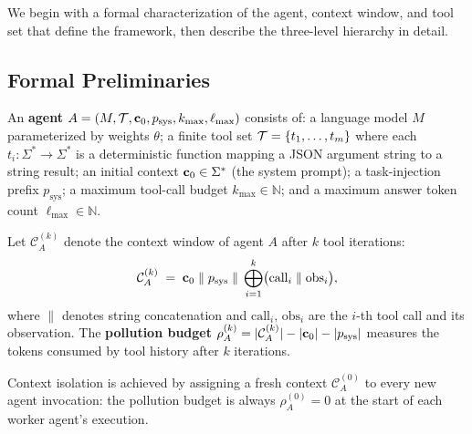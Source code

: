 
We begin with a formal characterization of the agent, context window, and
tool set that define the framework, then describe the three-level hierarchy
in detail.

\subsection{Formal Preliminaries}
\label{sec:arch:prelim}

\begin{definition}[Agent]
\label{def:agent}
An \textbf{agent} $A = (M, \mathcal{T}, \mathbf{c}_0, p_{\text{sys}}, k_{\max},
\ell_{\max})$ consists of: a language model $M$ parameterized by weights
$\theta$; a finite tool set $\mathcal{T} = \{t_1, \ldots, t_m\}$ where each
$t_i : \Sigma^* \to \Sigma^*$ is a deterministic function mapping a JSON
argument string to a string result; an initial context $\mathbf{c}_0 \in
\Sigma^*$ (the system prompt); a task-injection prefix $p_{\text{sys}}$; a
maximum tool-call budget $k_{\max} \in \mathbb{N}$; and a maximum answer
token count $\ell_{\max} \in \mathbb{N}$.
\end{definition}

\begin{definition}
\label{def:context}
Let $\mathcal{C}_A^{(k)}$ denote the context window of agent $A$ after $k$
tool iterations:
\begin{equation}
  \mathcal{C}_A^{(k)} \;=\; \mathbf{c}_0 \;\|\; p_{\text{sys}} \;\|\;
  \bigoplus_{i=1}^{k} \bigl( \text{call}_i \;\|\; \text{obs}_i \bigr),
\end{equation}
where $\|$ denotes string concatenation and $\text{call}_i,\, \text{obs}_i$
are the $i$-th tool call and its observation. The \textbf{pollution budget}
$\rho_A^{(k)} = |\mathcal{C}_A^{(k)}| - |\mathbf{c}_0| - |p_{\text{sys}}|$
measures the tokens consumed by tool history after $k$ iterations.
\end{definition}

\noindent Context isolation is achieved by assigning a fresh context
$\mathcal{C}_A^{(0)}$ to every new agent invocation: the pollution budget
is always $\rho_A^{(0)} = 0$ at the start of each worker agent's execution.

